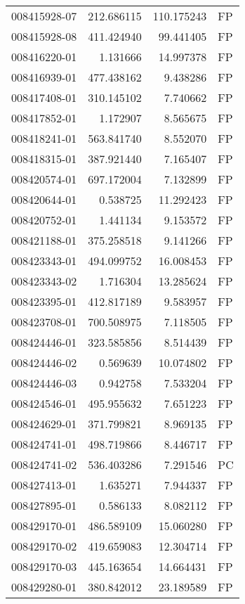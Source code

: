\begin{tabular}{lrrl}
008415928-07 &  212.686115 &   110.175243 &   FP \\
008415928-08 &  411.424940 &    99.441405 &   FP \\
008416220-01 &    1.131666 &    14.997378 &   FP \\
008416939-01 &  477.438162 &     9.438286 &   FP \\
008417408-01 &  310.145102 &     7.740662 &   FP \\
008417852-01 &    1.172907 &     8.565675 &   FP \\
008418241-01 &  563.841740 &     8.552070 &   FP \\
008418315-01 &  387.921440 &     7.165407 &   FP \\
008420574-01 &  697.172004 &     7.132899 &   FP \\
008420644-01 &    0.538725 &    11.292423 &   FP \\
008420752-01 &    1.441134 &     9.153572 &   FP \\
008421188-01 &  375.258518 &     9.141266 &   FP \\
008423343-01 &  494.099752 &    16.008453 &   FP \\
008423343-02 &    1.716304 &    13.285624 &   FP \\
008423395-01 &  412.817189 &     9.583957 &   FP \\
008423708-01 &  700.508975 &     7.118505 &   FP \\
008424446-01 &  323.585856 &     8.514439 &   FP \\
008424446-02 &    0.569639 &    10.074802 &   FP \\
008424446-03 &    0.942758 &     7.533204 &   FP \\
008424546-01 &  495.955632 &     7.651223 &   FP \\
008424629-01 &  371.799821 &     8.969135 &   FP \\
008424741-01 &  498.719866 &     8.446717 &   FP \\
008424741-02 &  536.403286 &     7.291546 &   PC \\
008427413-01 &    1.635271 &     7.944337 &   FP \\
008427895-01 &    0.586133 &     8.082112 &   FP \\
008429170-01 &  486.589109 &    15.060280 &   FP \\
008429170-02 &  419.659083 &    12.304714 &   FP \\
008429170-03 &  445.163654 &    14.664431 &   FP \\
008429280-01 &  380.842012 &    23.189589 &   FP \\

\end{tabular}
